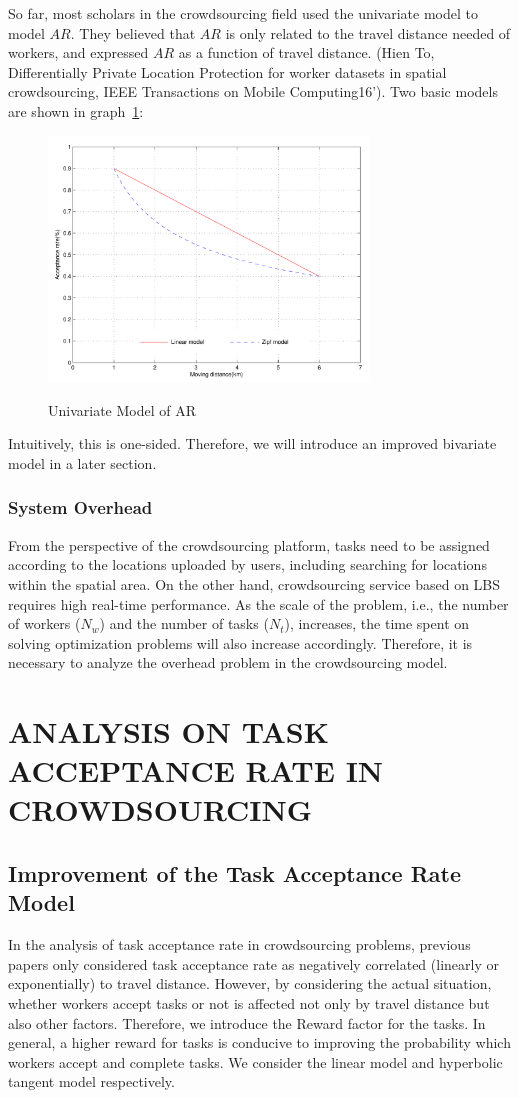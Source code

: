 So far, most scholars in the crowdsourcing field used the univariate model to model $AR$. They believed that $AR$ is only related to the travel distance needed of workers, and expressed $AR$ as a function of travel distance. (Hien To, Differentially Private Location Protection for worker datasets in spatial crowdsourcing, IEEE Transactions on Mobile Computing16'). Two basic models are shown in graph~\ref{img:UniModel}:

\begin{figure}
\includegraphics[width=8.5cm]{UniModel}
\label{img:UniModel}
\caption{Univariate Model of AR}
\end{figure}

Intuitively, this is one-sided. Therefore, we will introduce an improved bivariate model in a later section.

\subsubsection{System Overhead}
From the perspective of the crowdsourcing platform, tasks need to be assigned according to the locations uploaded by users, including searching for locations within the spatial area. On the other hand, crowdsourcing service based on LBS requires high real-time performance. As the scale of the problem, i.e., the number of workers ($N_w$) and the number of tasks ($N_t$), increases, the time spent on solving optimization problems will also increase accordingly. Therefore, it is necessary to analyze the overhead problem in the crowdsourcing model.

\section{ANALYSIS ON TASK ACCEPTANCE RATE IN CROWDSOURCING}
\subsection{Improvement of the Task Acceptance Rate Model}
In the analysis of task acceptance rate in crowdsourcing problems, previous papers only considered task acceptance rate as negatively correlated (linearly or exponentially) to travel distance. However, by considering the actual situation, whether workers accept tasks or not is affected not only by travel distance but also other factors. Therefore, we introduce the Reward factor for the tasks. In general, a higher reward for tasks is conducive to improving the probability which workers accept and complete tasks. We consider the linear model and hyperbolic tangent model respectively.

